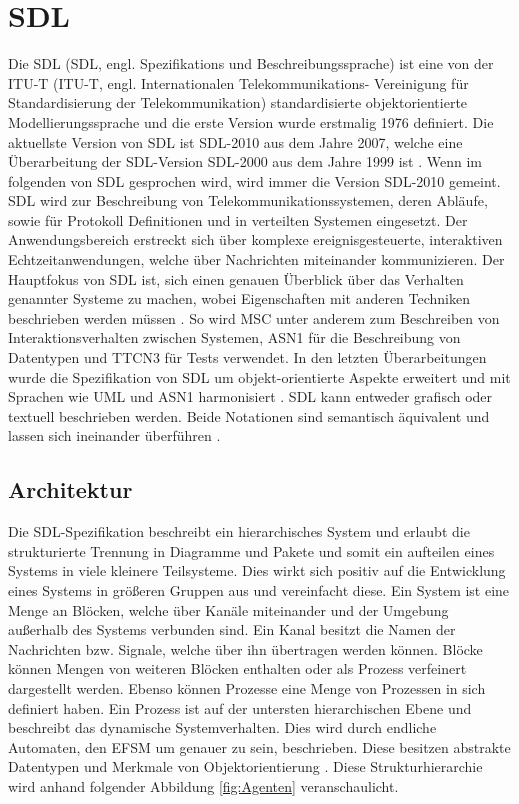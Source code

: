 \section{\acf{SDL}}
\label{sc:SDL}
Die \acs{SDL} (\ac{SDL}, engl. Spezifikations und Beschreibungssprache) ist eine von der \ac{ITU-T} (\ac{ITU-T}, engl. Internationalen 
Telekommunikations- Vereinigung für Standardisierung der Telekommunikation) standardisierte objektorientierte Modellierungssprache und die erste Version wurde erstmalig 
1976 definiert. Die aktuellste Version von \ac{SDL} ist \ac{SDL}-2010 aus dem Jahre 2007, welche eine Überarbeitung der \ac{SDL}-Version \ac{SDL}-2000 aus dem Jahre 
1999 ist \cite[vii,51]{ITUT100_2016}. Wenn im folgenden von \ac{SDL} gesprochen wird, wird immer die Version \acs{SDL}-2010 gemeint. 
\ac{SDL} wird zur Beschreibung von Telekommunikationssystemen, deren Abläufe, sowie für Protokoll Definitionen und in verteilten Systemen eingesetzt.
Der Anwendungsbereich erstreckt sich über komplexe ereignisgesteuerte, interaktiven Echtzeitanwendungen, welche über Nachrichten miteinander kommunizieren. 
Der Hauptfokus von \ac{SDL} ist, sich einen genauen Überblick über das Verhalten genannter Systeme zu machen, wobei Eigenschaften mit anderen Techniken beschrieben werden müssen \cite[1\psq]{ITUT100_2016}. 
So wird \ac{MSC} unter anderem zum Beschreiben von Interaktionsverhalten zwischen Systemen, \ac{ASN1} für die Beschreibung von Datentypen und \ac{TTCN3} für Tests verwendet. In den letzten Überarbeitungen wurde die Spezifikation von \ac{SDL} um objekt-orientierte Aspekte erweitert und mit Sprachen wie \ac{UML} und \ac{ASN1} harmonisiert \cite[vii\psqq]{ITUT100_2016}. \ac{SDL} kann entweder grafisch oder textuell beschrieben werden. Beide Notationen sind semantisch äquivalent und lassen sich ineinander überführen \cite[3]{Weber_2008}.

\subsection{Architektur}
\label{ssc:Architektur}
Die \ac{SDL}-Spezifikation beschreibt ein hierarchisches System und erlaubt die strukturierte Trennung in Diagramme und Pakete und somit ein aufteilen eines Systems in viele kleinere Teilsysteme. Dies wirkt sich positiv auf die Entwicklung eines Systems in größeren Gruppen aus und vereinfacht diese. Ein System ist eine Menge an Blöcken, welche über Kanäle miteinander und der Umgebung außerhalb des Systems verbunden sind. Ein Kanal besitzt die Namen der Nachrichten bzw. Signale, welche über ihn übertragen werden können. Blöcke können Mengen von weiteren Blöcken enthalten oder als Prozess verfeinert dargestellt werden. Ebenso können Prozesse eine Menge von Prozessen in sich definiert haben.
Ein Prozess ist auf der untersten hierarchischen Ebene und beschreibt das dynamische Systemverhalten. Dies wird durch endliche Automaten, den \ac{EFSM} um genauer zu sein, beschrieben. Diese besitzen abstrakte Datentypen und Merkmale von Objektorientierung \cite[3\psq]{ITUT100_2016}. Diese Strukturhierarchie wird anhand folgender Abbildung \ref{fig:Agenten} veranschaulicht.
 
